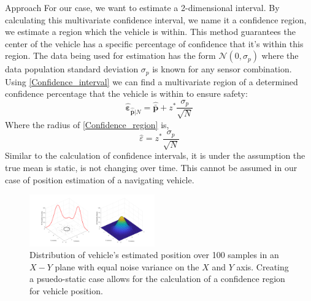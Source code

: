 \begin{section}{Approach}
For our case, we want to estimate a 2-dimensional interval. By calculating this multivariate confidence interval, we name it a confidence region, we estimate a region which the vehicle is within. This method guarantees the center of the vehicle has a specific percentage of confidence that it's within this region. The data being used for estimation has the form $\mathcal{N}(0,\sigma_p)$ where the data population standard deviation $\sigma_p$ is known for any sensor combination. Using \eqref{Confidence_interval} we can find a multivariate region of a determined confidence percentage that the vehicle is within to ensure safety:
    \begin{equation}
    \label{Confidence_region}
		\hat{\bm{\varepsilon}}_{\hat{\bar{\bm{p}}}|N} = \hat{\bar{\bm{p}}} + z^{*}\frac{\sigma_p}{\sqrt{N}}
	\end{equation}
Where the radius of \eqref{Confidence_region} is,
    \begin{equation}
		\hat{\varepsilon} = z^{*}\frac{\sigma_p}{\sqrt{N}}
	\end{equation}
Similar to the calculation of confidence intervals, it is under the assumption the true mean is static, is not changing over time. This cannot be assumed in our case of position estimation of a navigating vehicle. 
\begin{figure}[ht!]
\vspace{1pt}
\centering
\includegraphics[width=0.48\textwidth]{Gaussian2D.png}
\caption{Distribution of vehicle's estimated position over 100 samples in an $X-Y$ plane with equal noise variance on the $X$ and $Y$ axis. Creating a psuedo-static case allows for the calculation of a confidence region for vehicle position.}
\label{fig:gauss_pdf}
\end{figure}


\end{section}
